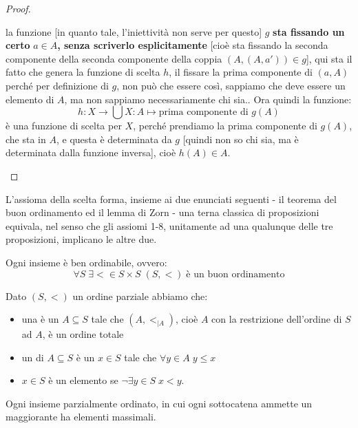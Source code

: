 \documentclass[11pt]{scrartcl}
\begin{document}
\begin{proof}
\begin{itemize}
{		la funzione [in quanto tale, l'iniettività non serve per questo] $g$ \textbf{sta fissando un certo} $a \in A$\textbf{, senza scriverlo esplicitamente} [cioè sta fissando la seconda componente della seconda componente della coppia $(A,(A,a')) \in g$], qui sta il fatto che genera la funzione di scelta $h$, il fissare la
		prima componente di $(a,A)$ perché per definizione di $g$, non può che essere così, sappiamo che deve essere un elemento di $A$, ma non sappiamo necessariamente chi sia.}. Ora quindi la funzione:
		\[ h : X \rightarrow \bigcup X : A \mapsto \text{prima componente di $g(A)$}
			\]
		è una funzione di scelta per $X$, perché prendiamo la prima componente di $g(A)$, che sta in $A$, e questa è determinata da $g$ [quindi non so chi sia, ma è determinata dalla funzione inversa], cioè $h(A) \in A$.
	\end{itemize}
\end{proof}

L'assioma della scelta forma, insieme ai due enunciati seguenti - il teorema del buon ordinamento ed il lemma di Zorn - una terna classica di proposizioni equivala, nel senso che gli assiomi 1-8, unitamente ad una qualunque delle tre proposizioni, implicano le altre due.

\begin{theorem}
	\label{buon_ordinamento}
	Ogni insieme è ben ordinabile, ovvero:
	\[ \forall S \; \exists < \in S \times S \; (S,<)\;\text{è un buon ordinamento}
		\]
\end{theorem}

\begin{definition}
	Dato $(S,<)$ un ordine parziale abbiamo che:
	\begin{itemize}
		\item una  è un $A \subseteq S$ tale che $(A,<_{|A})$, cioè $A$ con la restrizione dell'ordine di $S$ ad $A$, è un ordine totale
		\item un  di $A \subseteq S$ è un $x \in S$ tale che $\forall y \in A \; y \leq x$
		\item $x \in S$ è un elemento  se $\neg \exists y \in S \; x < y$.
	\end{itemize}
\end{definition}

\begin{lemma}
	\label{Zorn}
	Ogni insieme parzialmente ordinato, in cui ogni sottocatena ammette un maggiorante ha elementi massimali.
\end{lemma}
\end{document}
